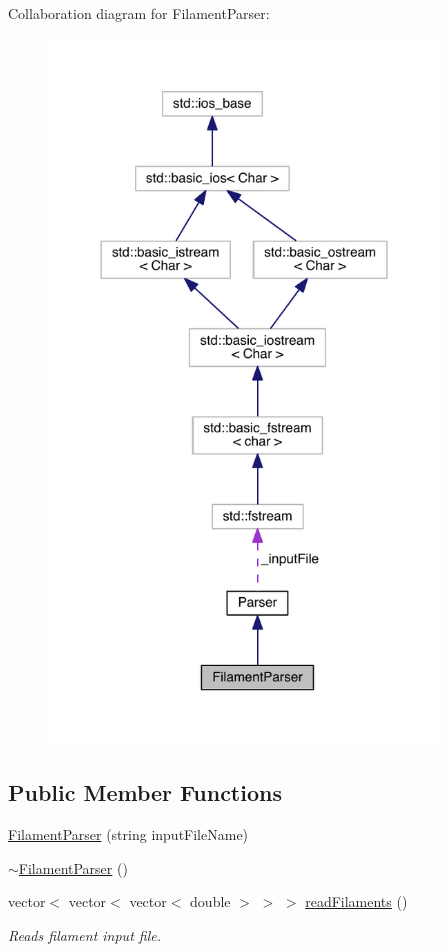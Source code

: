 Collaboration diagram for Filament\+Parser\+:\nopagebreak
\begin{figure}[H]
\begin{center}
\leavevmode
\includegraphics[width=294pt]{classFilamentParser__coll__graph}
\end{center}
\end{figure}
\subsection*{Public Member Functions}
\begin{DoxyCompactItemize}
\item 
\hyperlink{classFilamentParser_a9de1972aa1d6a3baa25f511a7d0f5491}{Filament\+Parser} (string input\+File\+Name)
\item 
\hyperlink{classFilamentParser_a6022cc18319de11164652e06ff517d46}{$\sim$\+Filament\+Parser} ()
\item 
vector$<$ vector$<$ vector$<$ double $>$ $>$ $>$ \hyperlink{classFilamentParser_a4eb083653cd26947ea96509aa48f2450}{read\+Filaments} ()
\begin{DoxyCompactList}\small\item\em Reads filament input file. \end{DoxyCompactList}\end{DoxyCompactItemize}
